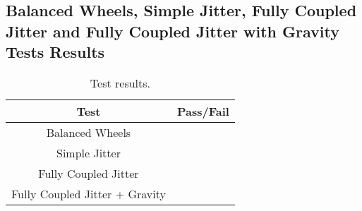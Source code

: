 \clearpage

\subsection{Balanced Wheels, Simple Jitter, Fully Coupled Jitter and Fully Coupled Jitter with Gravity Tests Results}

\begin{table}[htbp]
	\caption{Test results.}
	\label{tab:results}
	\centering \fontsize{10}{10}\selectfont
	\begin{tabular}{c | c } %
		\hline
		\textbf{Test} 				    & \textbf{Pass/Fail}  \\ \hline
		Balanced Wheels  &  \\
		Simple Jitter  &    \\ 
		Fully Coupled Jitter &   \\ 
		Fully Coupled Jitter + Gravity  &   \\ \hline
	\end{tabular}
\end{table}

\clearpage
